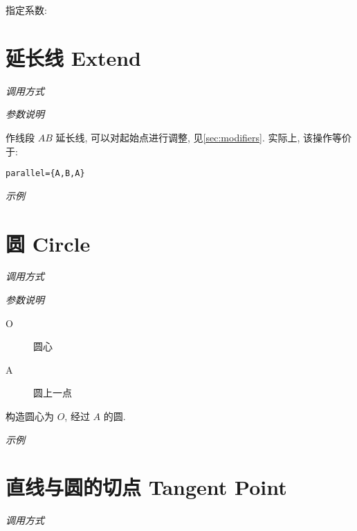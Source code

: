 
指定系数:


\section{延长线 Extend}

\emph{调用方式}

\begin{tcolorbox}{}
\end{tcolorbox}

\emph{参数说明}

作线段 $AB$ 延长线,
可以对起始点进行调整, 见\ref{sec:modifiers}.
实际上, 该操作等价于:

\begin{verbatim}
parallel={A,B,A}
\end{verbatim}

\emph{示例}


\section{圆 Circle}

\emph{调用方式}

\begin{tcolorbox}{}
\end{tcolorbox}

\emph{参数说明}

\begin{description}
  \item[O] 圆心
  \item[A] 圆上一点
\end{description}

构造圆心为 $O$, 经过 $A$ 的圆.

\emph{示例}


\section{直线与圆的切点 Tangent Point}

\emph{调用方式}

\begin{tcolorbox}{}
\end{tcolorbox}

